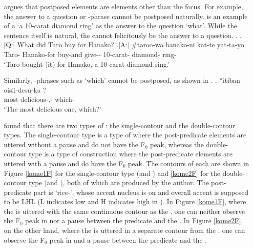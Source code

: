  argues that
postposed elements are elements other than the focus.
For example,
the answer to a question or -phrase cannot be postposed naturally.
\Next is an example of a  `a 10-carat diamond ring' as the answer to the question `what'.
While the sentence itself is natural,
the  cannot felicitously be the answer to a question.
%
\ex.
 \a.[Q:] What did Taro buy for Hanako?
 \bg.[A:] \#taroo-wa hanako-ni kat-te yat-ta-yo    \\
 		Taro- Hanako-for buy-and give-- 10-carat- diamond- ring- \\
		`Taro bought (it) for Hanako, a 10-carat diamond ring.'

Similarly,
-phrases such as  `which' cannot be postposed,
as shown in \Next.
%
\exg. *itiban oisii-desu-ka ? \\
		most delicious-.- which- \\
		`The most delicious one, which?'


 found that
there are two types of :
the single-contour and the double-contour types.
The single-contour type is a type of 
where the post-predicate elements are uttered without a pause and do not have the F$_{0}$ peak,
whereas the double-contour type is a type of construction
where the post-predicate elements are uttered with a pause and do have the F$_{0}$ peak.
The  contours of each  are shown in Figure \ref{kome1F} for the single-contour type (\Next[A] and \NNext[A]) and \ref{kome2F} for the double-contour type (\Next[A$^{\prime}$] and \NNext[A$^{\prime}$]),
both of which are produced by the author.
The post-predicate part is  `rice-',
whose accent nucleus is on  and overall accent is supposed to be LHL (L indicates low and H indicates high in ).
In Figure \ref{kome1F}, where the  is uttered with the same continuous contour as the ,
one can neither observe the F$_{0}$ peak in  nor a pause between the predicate and the .
In Figure \ref{kome2F}, on the other hand,
where the  is uttered in a separate contour from the ,
one can observe the F$_{0}$ peak in  and a pause between the predicate and the .

